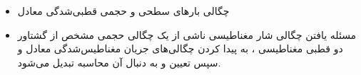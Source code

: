 \begin{ELunit}

\begin{itemize}
\tightlist
\item
  چگالی بارهای سطحی و حجمی قطبی‌شدگی معادل
\end{itemize}


\begin{itemize}
\tightlist
\item
  مسئله یافتن چگالی شار مغناطیسی  ناشی از یک چگالی حجمی مشخص از گشتاور دو قطبی مغناطیسی ، به پیدا کردن چگالی‌های جریان مغناطیس‌شدگی معادل و سپس تعیین  و به دنبال آن محاسبه  تبدیل می‌شود.
\end{itemize}

\end{ELunit}


